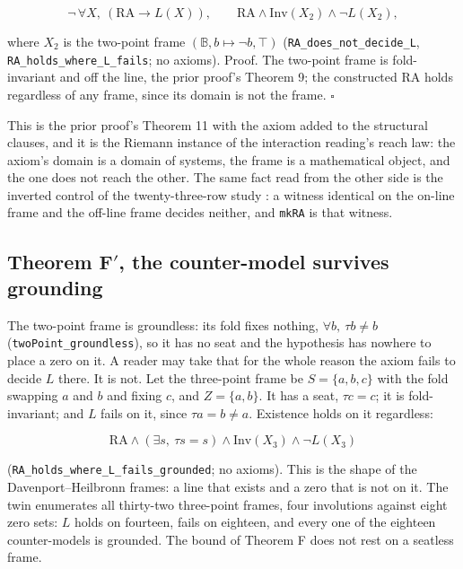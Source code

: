 \documentclass[10pt,twocolumn]{article}
\begin{document}
\[\neg\, \forall X,\ (\mathrm{RA} \to L(X)), \qquad \mathrm{RA} \wedge \mathrm{Inv}(X_2) \wedge \neg L(X_2),\]

where \(X_2\) is the two-point frame
\((\mathbb{B}, b \mapsto \neg b, \top)\)
(\texttt{RA\_\allowbreak does\_\allowbreak not\_\allowbreak decide\_\allowbreak L},
\texttt{RA\_\allowbreak holds\_\allowbreak where\_\allowbreak L\_\allowbreak fails};
no axioms). Proof. The two-point frame is fold-invariant and off the
line, the prior proof's Theorem 9; the constructed \(\mathrm{RA}\) holds
regardless of any frame, since its domain is not the frame. \(\square\)

This is the prior proof's Theorem 11 with the axiom added to the
structural clauses, and it is the Riemann instance of the interaction
reading's reach law: the axiom's domain is a domain of systems, the
frame is a mathematical object, and the one does not reach the other.
The same fact read from the other side is the inverted control of the
twenty-three-row study \cite{islamrows}: a witness identical on the
on-line frame and the off-line frame decides neither, and \texttt{mkRA}
is that witness.

\hypertarget{theorem-f-the-counter-model-survives-grounding}{%
\subsection{\texorpdfstring{Theorem F\('\), the counter-model survives
grounding}{Theorem F\textquotesingle, the counter-model survives grounding}}\label{theorem-f-the-counter-model-survives-grounding}}

The two-point frame is groundless: its fold fixes nothing,
\(\forall b,\ \tau b \neq b\)
(\texttt{twoPoint\_\allowbreak groundless}), so it has no seat and the
hypothesis has nowhere to place a zero on it. A reader may take that for
the whole reason the axiom fails to decide \(L\) there. It is not. Let
the three-point frame be \(S = \{a, b, c\}\) with the fold swapping
\(a\) and \(b\) and fixing \(c\), and \(Z = \{a, b\}\). It has a seat,
\(\tau c = c\); it is fold-invariant; and \(L\) fails on it, since
\(\tau a = b \neq a\). Existence holds on it regardless:

\[\mathrm{RA} \wedge (\exists s,\ \tau s = s) \wedge \mathrm{Inv}(X_3) \wedge \neg L(X_3)\]

(\texttt{RA\_\allowbreak holds\_\allowbreak where\_\allowbreak L\_\allowbreak fails\_\allowbreak grounded};
no axioms). This is the shape of the Davenport--Heilbronn frames: a line
that exists and a zero that is not on it. The twin enumerates all
thirty-two three-point frames, four involutions against eight zero sets:
\(L\) holds on fourteen, fails on eighteen, and every one of the
eighteen counter-models is grounded. The bound of Theorem F does not
rest on a seatless frame.
\end{document}
